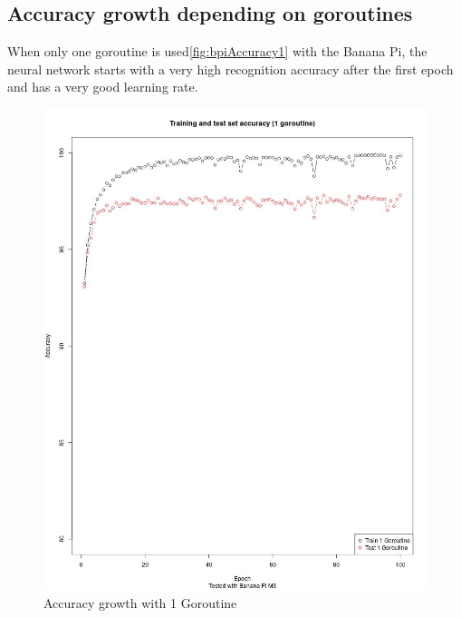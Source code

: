 \documentclass[11pt]{article}
\begin{document}
\subsection{Accuracy growth depending on goroutines}
When only one goroutine is used\autoref{fig:bpiAccuracy1} with the Banana Pi, the neural network starts with a very high recognition accuracy after the first epoch and has a very good learning rate.
\begin{figure}[H]
	\centering
	\includegraphics[width=1.0\textwidth, height=0.75\textheight]{./Data/Final/Images/bpiAccuracy1.jpg}
	\vspace{-1em}
	\caption{Accuracy growth with 1 Goroutine}
	\vspace{-0.5em}
	\label{fig:bpiAccuracy1}
\end{figure}
\end{document}
